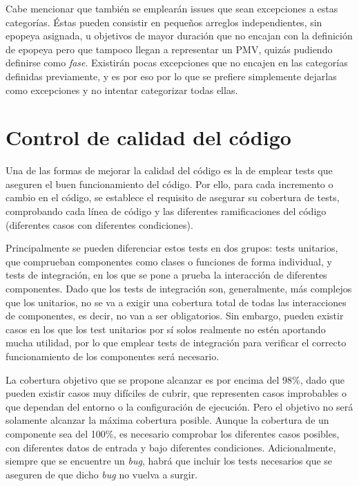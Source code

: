 Cabe mencionar que también se emplearán issues que sean excepciones a estas categorías. Éstas pueden consistir en pequeños arreglos independientes, sin epopeya asignada, u objetivos de mayor duración que no encajan con la definición de epopeya pero que tampoco llegan a representar un PMV, quizás pudiendo definirse como \textit{fase}. Existirán pocas excepciones que no encajen en las categorías definidas previamente, y es por eso por lo que se prefiere simplemente dejarlas como excepciones y no intentar categorizar todas ellas.

\section{Control de calidad del código}

Una de las formas de mejorar la calidad del código es la de emplear tests que aseguren el buen funcionamiento del código. Por ello, para cada incremento o cambio en el código, se establece el requisito de asegurar su cobertura de tests, comprobando cada línea de código y las diferentes ramificaciones del código (diferentes casos con diferentes condiciones).

Principalmente se pueden diferenciar estos tests en dos grupos: tests unitarios, que comprueban componentes como clases o funciones de forma individual, y tests de integración, en los que se pone a prueba la interacción de diferentes componentes. Dado que los tests de integración son, generalmente, más complejos que los unitarios, no se va a exigir una cobertura total de todas las interacciones de componentes, es decir, no van a ser obligatorios. Sin embargo, pueden existir casos en los que los test unitarios por sí solos realmente no estén aportando mucha utilidad, por lo que emplear tests de integración para verificar el correcto funcionamiento de los componentes será necesario.

La cobertura objetivo que se propone alcanzar es por encima del 98\%, dado que pueden existir casos muy difíciles de cubrir, que representen casos improbables o que dependan del entorno o la configuración de ejecución. Pero el objetivo no será solamente alcanzar la máxima cobertura posible. Aunque la cobertura de un componente sea del 100\%, es necesario comprobar los diferentes casos posibles, con diferentes datos de entrada y bajo diferentes condiciones. Adicionalmente, siempre que se encuentre un \textit{bug}, habrá que incluir los tests necesarios que se aseguren de que dicho \textit{bug} no vuelva a surgir.

